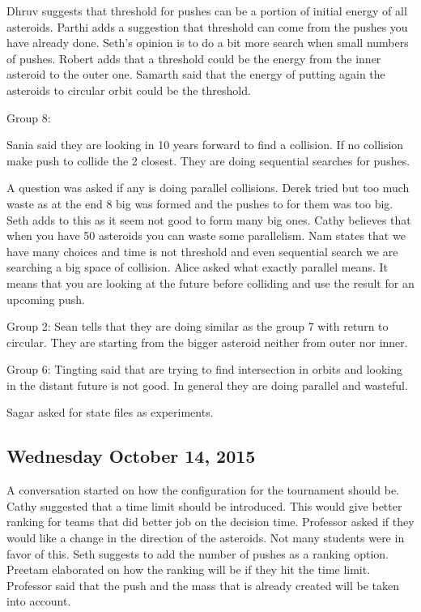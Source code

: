 Dhruv suggests that threshold for pushes can be a portion of initial energy of all asteroids.
Parthi adds a suggestion that threshold can come from the pushes you have already done.
Seth’s opinion is to do  a bit more search when small numbers of pushes.
Robert adds that a threshold could be the energy from the inner asteroid to the outer one.
Samarth said that the energy of putting again the asteroids to circular orbit could be the threshold.

Group 8:

Sania said they are looking in 10 years forward to find a collision. If no collision make push to collide the 2 closest. They are doing sequential searches for pushes.

A question was asked if any is doing parallel collisions.
Derek tried but too much waste as at the end 8 big was formed and the pushes to for them was too big.
Seth adds to this as it seem not good to form many big ones.
Cathy believes that when you have 50 asteroids you can waste some parallelism.
Nam states that we have many choices and time is not threshold and even sequential search we are searching a big space of collision.
Alice asked what exactly parallel means.
It means that you are looking at the future before colliding and use the result for an upcoming push.

Group 2:
Sean tells that they are doing similar as the group 7 with return to circular. They are starting from the bigger asteroid neither from outer nor inner.

Group 6:
Tingting said that are trying to find intersection in orbits and looking in the distant future is not good. In general they are doing parallel and wasteful.

Sagar asked for state files as experiments.
\subsection{Wednesday October 14, 2015}
A conversation started on how the configuration for the tournament should be.
Cathy suggested that a time limit should be introduced. This would give better ranking for teams that did better job on the decision time. 
Professor asked if they would like a change in the direction of the asteroids. Not many students were in favor of this.
Seth suggests to add the number of pushes as a ranking option.
Preetam elaborated on how the ranking will be if they hit the time limit.
Professor said that the push and the mass that is already created will be taken into account.

